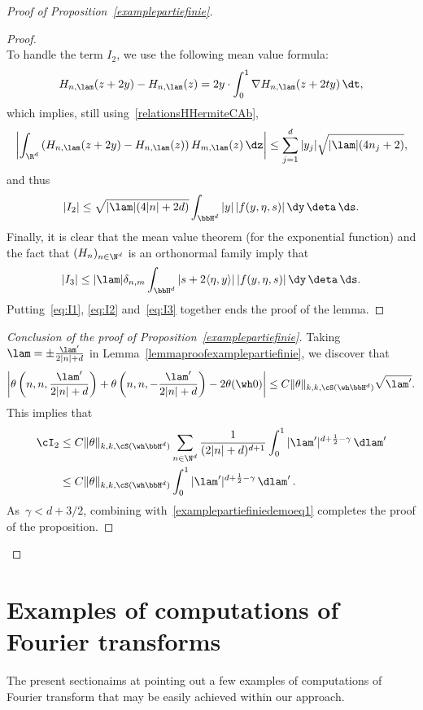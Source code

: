 \begin{proof}[Proof of Proposition~\ref{examplepartiefinie}]
\begin{proof}
\begin{equation}
\end{equation}
To handle the term $I_2$, we use the following mean value formula:
\[
H_{n,\lam}(z+2y)-H_{n,\lam}(z)=2 y\cdot\int_0^1\nabla H_{n,\lam}(z+2ty)\,\dt,
\]
which implies, still using~\eqref{relationsHHermiteCAb},
\[
\left| \int_{\R^d} \left(H_{n,\lam}(z+2y)-H_{n,\lam}(z)\right)H_{m,\lam}(z)\,\dz\right|
\leq \sum_{j=1}^d |y_j| \sqrt{|\lam|(4n_j+2)},
\]
and thus
\begin{equation}\label{eq:I2}
|I_2|\leq \sqrt{|\lam|(4|n|+2d)}\int_{\bbH^d} |y|\,|f(y,\eta,s)|\,\dy\,\deta\,\ds.
\end{equation}
Finally, it is clear that the mean value theorem (for the exponential function) and the fact that $(H_n)_{n\in\N^d}$ is an orthonormal family imply that
\begin{equation}\label{eq:I3}
|I_3|\leq |\lam| \delta_{n,m}\int_{\bbH^d} |s+2\langle\eta,y\rangle|\,|f(y,\eta,s)|\,\dy\,\deta\,\ds.
\end{equation}
Putting~\eqref{eq:I1}, \eqref{eq:I2} and~\eqref{eq:I3} together ends the proof of the lemma.
\end{proof}

\begin{proof}[Conclusion of the proof of Proposition~\ref{examplepartiefinie}]
Taking~$\lam = \pm\frac {\lam'} {2|n|+d}$ in Lemma~\ref{lemmaproofexamplepartiefinie}, we discover that
\[
\left | \theta\left (n,n,\frac {\lam'} {2|n|+d}\right) +\theta \left (n,n,-\frac {\lam'} {2|n|+d}\right) -2\theta(\wh 0)\right | \leq C \|\theta\|_{k,k,\cS(\wh \bbH^d)}\sqrt {\lam'}.
\]
This implies that
\begin{align*}
\cI_2 & \leq C \|\theta\|_{k,k,\cS(\wh \bbH^d)} \sum_{n\in \N^d} \frac {1}{ (2|n|+d)^{d+1} } \int_0^1 |\lam'|^{d+\frac 12-\gamma} \,\dlam'\\
& \leq C \|\theta\|_{k,k,\cS(\wh \bbH^d)} \int_0^1 |\lam'|^{d+\frac 12-\gamma} \,\dlam'\,.
\end{align*}
As~$\gamma<d+3/2$, combining with~\eqref{examplepartiefiniedemoeq1} completes the proof of the proposition.
\end{proof}
\let\qed\relax
\end{proof}


\section{Examples of computations of Fourier transforms}\label{computeFHcS'}

The present sectionaims at pointing out a few examples of computations of Fourier transform that may be easily achieved within our approach.

